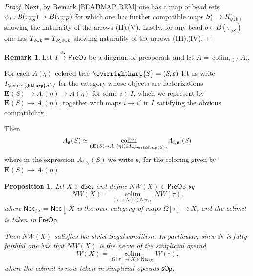 \documentclass[a4paper,10pt
,draft
]{article}%
\numberwithin{equation}{section}
\numberwithin{figure}{section}
\newtheorem{proposition}[equation]{Proposition}%
\theoremstyle{definition} %
\newtheorem{remark}[equation]{Remark}%
\newcommand{\vect}[1]{\text{\overrightharp{\ensuremath{#1}}}}
\DeclareMathOperator{\colim}{colim}%
\newcommand{\1}{\ensuremath{\mathbbm 1}}%
\begin{document}
\begin{proof}
	Next, by Remark \ref{BEADMAP REM}
	one has a map of bead sets
	$\psi_{\**} \colon 
	B(\tau_{\overline{\phi S}})
	\to
	B(\tau_{\overline{\phi' R}})$
	for which one has further compatible maps
	$S^{\tau}_b
	\to 
	R^{\tau}_{\psi_{\**}b}$,
	showing the naturality of the arrows (II),(V).
	Lastly, for any bead 
	$b \in B(\tau_{\overline{\phi S}})$
	one has
	$T_{\phi_{\**}b} = T_{\phi'_{\**} \psi_{\**}b}$
	showing naturality of the arrows (III),(IV).
\end{proof}





\begin{remark}\label{PREOPCOLEV REM}
	Let $I \xrightarrow{A_{\bullet}} \mathsf{PreOp}$
	be a diagram of preoperads and let
	$A = \colim_{i \in I} A_i$.
	
	For each $A(\eta)$-colored tree 
	$\vect{S} = (S,\mathfrak{s})$
	let us write
	$I_{\vect{S}/}$
	for the category whose objects are factorizations
	$\boldsymbol{E}(S) \to A_i(\eta) \to A(\eta)$ 
	for some $i \in I$,
	which we represent by 
	$\boldsymbol{E}(S) \to A_i(\eta)$,
	together with maps $i \to i'$ in $I$
	satisfying the obvious compatibility.
	
	Then
\begin{equation}\label{COLIMALT EQ}
	A_{\mathfrak{s}}(S) \simeq 
	\underset{(\boldsymbol{E}(S) \to A_i(\eta)) \in I_{\vect{S}/}}{\colim}
	A_{i,
	\mathfrak{s}_i}(S)
\end{equation}
	where in the expression 
	$A_{i,\mathfrak{s}_i}(S)$
	we write 
	$\mathfrak{s}_i$
	for the coloring given by
	$\boldsymbol{E}(S) \to A_i(\eta)$.
\end{remark}





\begin{proposition}
	\label{NWKANEX_PROP}
	Let $X \in \mathsf{dSet}$ and define
	$NW(X) \in \mathsf{PreOp}$ by
	\begin{equation}\label{NWKANEX EQ}
	NW(X) =
	\underset{(\tau \to X)
		\in \mathsf{Nec}_{/X}}{\colim}
	NW(\tau).
	\end{equation}
	where
	$\mathsf{Nec}_{/X} = \mathsf{Nec} \downarrow X$ is the over category of maps $\Omega[\tau] \to X$, and
	the colimit is taken in $\mathsf{PreOp}$.
	
	Then $NW(X)$ satisfies the strict Segal condition.
	In particular, since $N$ is fully-faithful one has that
	$NW(X)$ is the nerve of the simplicial operad
\[
	W(X) =
	\underset{\Omega[\tau] \to X
	\in \mathsf{Nec}_{/X}}{\colim}
	W(\tau).
\]
	where the colimit is now taken in simplicial operads
	$\mathsf{sOp}$.
\end{proposition}
\end{document}
